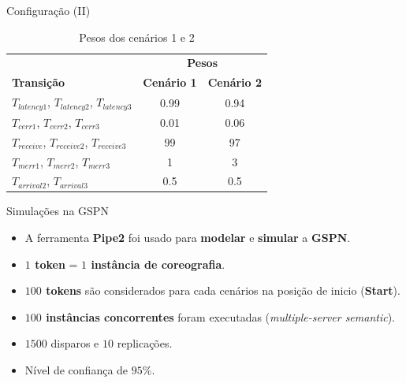 \documentclass[xcolor=svgnames]{beamer}
\newcommand {\otoprule}{\midrule [\heavyrulewidth]}  %
\begin{document}
  \begin{frame}{ Configuração (II) }
        \begin{table}[!h]
            \centering
            \caption{Pesos dos cenários 1 e 2}
            \label{table:transitionsConfigurations}
            \begin{tabular}{ lcc}
	      \toprule	
        		    &   \multicolumn{2}{c}{ \textbf{Pesos} } \\
	      \cmidrule(r){2-3}
              \textbf{Transição}      		&      \textbf{Cenário 1}   &  \textbf{ Cenário 2} 		\\
	      \otoprule
               $T_{latency1}$, $T_{latency2}$, $T_{latency3}$ 	& 	0.99       &   0.94	\\
               $T_{cerr1}$, $T_{cerr2}$, $T_{cerr3}$      	&  	0.01 	   &   0.06	\\
               $T_{receive}$, $T_{receive2}$, $T_{receive3}$  &  	99  	   &    97	\\
               $T_{merr1}$, $T_{merr2}$, $T_{merr3}$   &   1 	   &    3	\\
               $T_{arrival2}$, $T_{arrival3}$   &  0.5  &	0.5	\\
              \bottomrule
            \end{tabular}
        \end{table}

  \end{frame}


    \begin{frame}{ Simulações na GSPN }
      \begin{itemize}
	\item <1-> A ferramenta \textbf{Pipe2} foi usado para \textbf{modelar} e \textbf{simular} a \textbf{GSPN}.
	\item <2-> \textbf{$1$ token} = \textbf{$1$ instância de coreografia}.
	\item <2-> \textbf{$100$ tokens} são considerados para cada cenários na posição de inicio (\textbf{Start}).
	\item <2-> \textbf{$100$ instâncias concorrentes} foram executadas (\textit{multiple-server semantic}).
	\item <3-> $1500$ disparos e $10$ replicações.
	\item <3-> Nível de confiança de $95\%$.
      \end{itemize}
    \end{frame}
\end{document}
